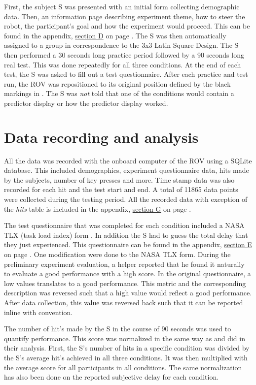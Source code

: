 First, the subject S was presented with an initial form collecting demographic data. Then, an information page describing experiment theme, how to steer the robot, the participant's goal and how the experiment would proceed. This can be found in the appendix, \hyperref[appInfo]{section D} on page \pageref{appInfo}. The S was then automatically assigned to a group in correspondence to the 3x3 Latin Square Design. The S then performed a 30 seconds long practice period followed by a 90 seconds long real test. This was done repeatedly for all three conditions. At the end of each test, the S was asked to fill out a test questionnaire.  After each practice and test run, the ROV was repositioned to its original position defined by the black markings in . The S was \emph{not} told that one of the conditions would contain a predictor display or how the predictor display worked.

\section{Data recording and analysis}

All the data was recorded with the onboard computer of the ROV using a SQLite database. This included demographics, experiment questionnaire data, hits made by the subjects, number of key presses and more. Time stamp data was also recorded for each hit and the test start and end. A total of 11865 data points were collected during the testing period. All the recorded data with exception of the \emph{hits} table is included in the appendix, \hyperref[appDatabase]{section G} on page \pageref{appDatabase}.

The test questionnaire that was completed for each condition included a NASA TLX (task load index) form \citep{Hart1988}. In addition the S had to guess the total delay that they just experienced. This questionnaire can be found in the appendix, \hyperref[appSurvey]{section E} on page \pageref{appSurvey}. One modification were done to the NASA TLX form. During the preliminary experiment evaluation, a helper reported that he found it naturally to evaluate a good performance with a high score. In the original questionnaire, a low values translates to a good performance. This metric and the corresponding description was reversed such that a high value would reflect a good performance. After data collection, this value was reversed back such that it can be reported inline with convention.

The number of hit's made by the S in the course of 90 seconds was used to quantify performance. This score was normalized in the same way as \citet{Rachmielowski2010} and \citet{Lovi2010} did in their analysis. First, the S's number of hits in a specific condition was divided by the S's average hit's achieved in all three conditions. It was then multiplied with the average score for all participants in all conditions. The same normalization has also been done on the reported subjective delay for each condition.

